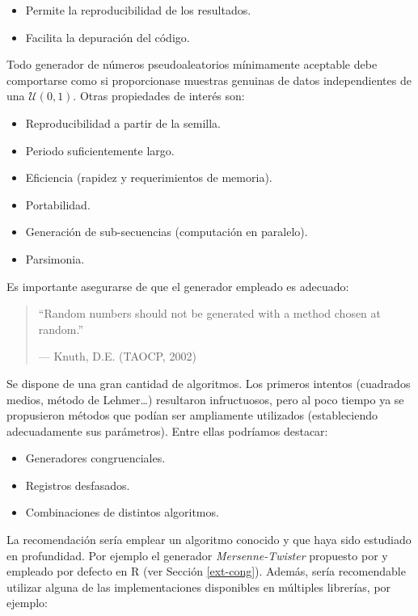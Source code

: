 \documentclass[
  10pt,
]{book}
\theoremstyle{break}
\theoremstyle{nonumberplain}
\begin{document}
\begin{itemize}
\item
  Permite la reproducibilidad de los resultados.
\item
  Facilita la depuración del código.
\end{itemize}

Todo generador de números pseudoaleatorios mínimamente aceptable debe comportarse como si proporcionase muestras genuinas de datos independientes de una \(\mathcal{U}(0,1)\).
Otras propiedades de interés son:

\begin{itemize}
\item
  Reproducibilidad a partir de la semilla.
\item
  Periodo suficientemente largo.
\item
  Eficiencia (rapidez y requerimientos de memoria).
\item
  Portabilidad.
\item
  Generación de sub-secuencias (computación en paralelo).
\item
  Parsimonia.
\end{itemize}

Es importante asegurarse de que el generador empleado es adecuado:

\begin{quote}
``Random numbers should not be generated with a method chosen at random.''

--- Knuth, D.E. (TAOCP, 2002)
\end{quote}

Se dispone de una gran cantidad de algoritmos.
Los primeros intentos (cuadrados medios, método de Lehmer\ldots) resultaron infructuosos, pero al poco tiempo ya se propusieron métodos que podían ser ampliamente utilizados (estableciendo adecuadamente sus parámetros).
Entre ellas podríamos destacar:

\begin{itemize}
\item
  Generadores congruenciales.
\item
  Registros desfasados.
\item
  Combinaciones de distintos algoritmos.
\end{itemize}

La recomendación sería emplear un algoritmo conocido y que haya sido estudiado en profundidad.
Por ejemplo el generador \emph{Mersenne-Twister} propuesto por \citet{matsumoto1998} y empleado por defecto en R (ver Sección \ref{ext-cong}).
Además, sería recomendable utilizar alguna de las implementaciones disponibles en múltiples librerías, por ejemplo:
\end{document}
